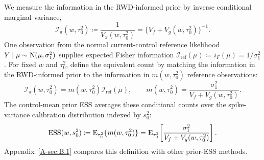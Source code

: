 \documentclass[11pt]{article}
\begin{document}
We measure the information in the RWD-informed prior by inverse conditional marginal variance,
\[
\mathcal I_{\pi}(w,\tau_0^2)
\coloneqq\frac{1}{V_{\pi}(w,\tau_0^2)}
=\{V_f+V_g(w,\tau_0^2)\}^{-1}.
\]
One observation from the normal current-control reference likelihood
$Y\mid\mu\sim\mathrm{N}(\mu,\sigma_{1}^2)$ supplies expected Fisher information
$\mathcal I_{\mathrm{ref}}(\mu)\coloneqq i_F(\mu)=1/\sigma_{1}^2$. For fixed $w$ and $\tau_0^2$, define the equivalent count by matching the information in the RWD-informed prior to the information in $m(w,\tau_0^2)$ reference observations:
\begin{equation}\label{eq:matchedcount}
\mathcal I_{\pi}(w,\tau_0^2)
=m(w,\tau_0^2)\mathcal I_{\mathrm{ref}}(\mu),
\qquad
m(w,\tau_0^2)=\frac{\sigma_{1}^2}{V_f+V_g(w,\tau_0^2)}.
\end{equation}
The control-mean prior ESS averages these conditional counts over the spike-variance calibration distribution indexed by $s_0^2$:
\begin{equation}\label{eq:essgeneral}
\operatorname{ESS}(w,s_0^2)
\coloneqq\operatorname{E}_{\tau_0^2}\{m(w,\tau_0^2)\}
=\operatorname{E}_{\tau_0^2}\!\left[
\frac{\sigma_{1}^2}{V_f+V_g(w,\tau_0^2)}
\right].
\end{equation}
Appendix~\ref{A-sec:B.1} compares this definition with other prior-ESS methods.
\end{document}
